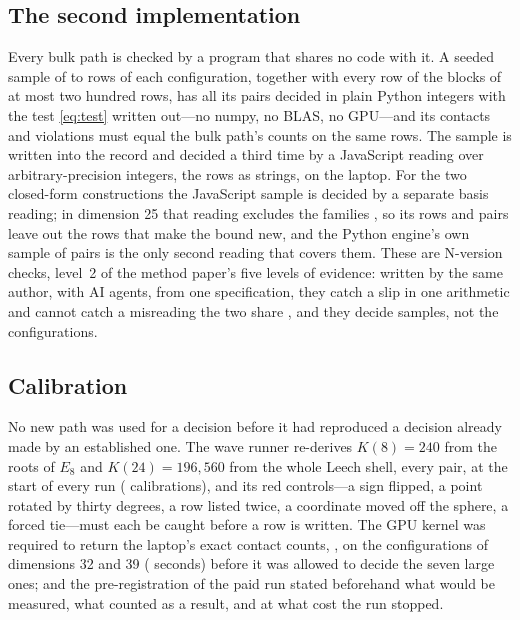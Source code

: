 \documentclass[preprint,11pt,authoryear,a4paper]{elsarticle}
\begin{document}
\subsection{The second implementation}\label{sec:second}
Every bulk path is checked by a program that shares no code with it. A seeded sample of \QkSampleRowsMin{} to \QkSampleRowsMax{} rows of each configuration, together with every row of the blocks of at most two hundred rows, has all its pairs decided in plain Python integers with the test \eqref{eq:test} written out---no numpy, no BLAS, no GPU---and its contacts and violations must equal the bulk path's counts on the same rows. The sample is written into the record and decided a third time by a JavaScript reading over arbitrary-precision integers, the rows as strings, on the laptop. For the two closed-form constructions the JavaScript sample is decided by a separate basis reading; in dimension 25 that reading excludes the families \QkDTwentyFiveJsExcluded, so its \QkDTwentyFiveJsRows{} rows and \QkDTwentyFiveJsPairs{} pairs leave out the rows that make the bound new, and the Python engine's own sample of \QkDTwentyFiveSpotPairs{} pairs is the only second reading that covers them. These are N-version checks, level~2 of the method paper's five levels of evidence: written by the same author, with AI agents, from one specification, they catch a slip in one arithmetic and cannot catch a misreading the two share \citep{KnightLeveson86}, and they decide samples, not the configurations.

\subsection{Calibration}\label{sec:calibration}
No new path was used for a decision before it had reproduced a decision already made by an established one. The wave runner re-derives $K(8)=240$ from the roots of $E_8$ and $K(24)=196{,}560$ from the whole Leech shell, every pair, at the start of every run (\QkCalibrations{} calibrations), and its \QkRedControls{} red controls---a sign flipped, a point rotated by thirty degrees, a row listed twice, a coordinate moved off the sphere, a forced tie---must each be caught before a row is written. The GPU kernel was required to return the laptop's exact contact counts, \MtKwCalContacts, on the configurations of dimensions 32 and 39 (\QkCalSeconds{} seconds) before it was allowed to decide the seven large ones; and the pre-registration of the paid run stated beforehand what would be measured, what counted as a result, and at what cost the run stopped.
\end{document}
